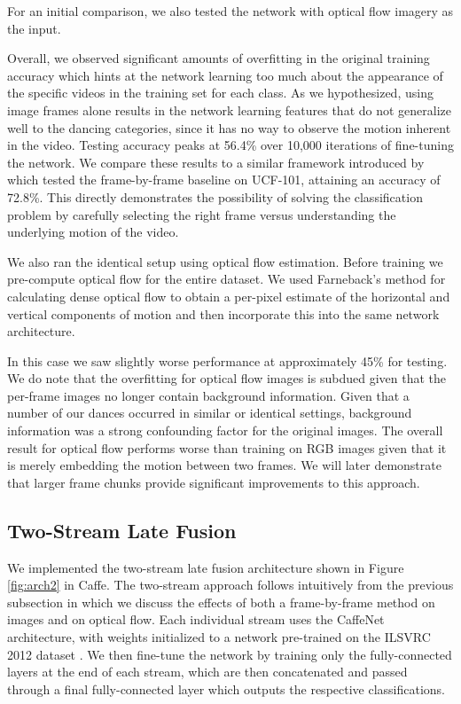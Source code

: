 \documentclass[10pt,twocolumn,letterpaper]{article}
\begin{document}
For an initial comparison, we also tested the network with optical flow imagery as the input.

Overall, we observed significant amounts of overfitting in the original training accuracy which hints at the network learning too much about the appearance of the specific videos in the training set for each class. As we hypothesized, using image frames alone results in the network learning features that do not generalize well to the dancing categories, since it has no way to observe the motion inherent in the video. Testing accuracy peaks at 56.4\% over 10,000 iterations of fine-tuning the network. We compare these results to a similar framework introduced by \cite{wang2015towards} which tested the frame-by-frame baseline on UCF-101, attaining an accuracy of 72.8\%. This directly demonstrates the possibility of solving the classification problem by carefully selecting the right frame versus understanding the underlying motion of the video.

We also ran the identical setup using optical flow estimation. Before training we pre-compute optical flow for the entire dataset. We used Farneback's method for calculating dense optical flow \cite{farneback2003two} to obtain a per-pixel estimate of the horizontal and vertical components of motion and then incorporate this into the same network architecture.

In this case we saw slightly worse performance at approximately 45\% for testing. We do note that the overfitting for optical flow images is subdued given that the per-frame images no longer contain background information. Given that a number of our dances occurred in similar or identical settings, background information was a strong confounding factor for the original images. The overall result for optical flow performs  worse than training on RGB images given that it is merely embedding the motion between two frames. We will later demonstrate that larger frame chunks provide significant improvements to this approach.

\subsection{Two-Stream Late Fusion}

We implemented the two-stream late fusion architecture shown in Figure \ref{fig:arch2} in Caffe\cite{jia2014caffe}. The two-stream approach follows intuitively from the previous subsection in which we discuss the effects of both a frame-by-frame method on images and on optical flow. Each individual stream uses the CaffeNet architecture, with weights initialized to a network pre-trained on the ILSVRC 2012 dataset \cite{ILSVRC15}. We then fine-tune the network by training only the fully-connected layers at the end of each stream, which are then concatenated and passed through a final fully-connected layer which outputs the respective classifications.
\end{document}
